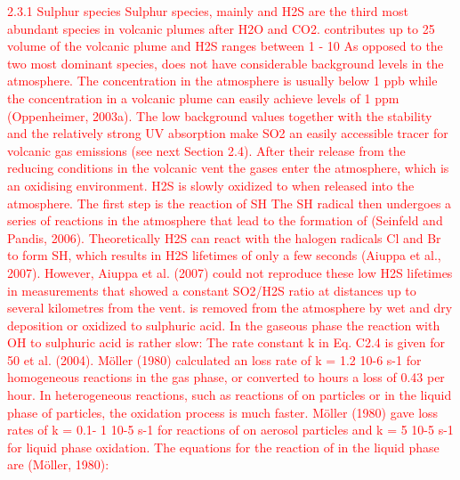 \documentclass  [
  paper    = a4,
  BCOR     = 10mm,
  twoside,
  fontsize = 12pt,
  fleqn,
  toc      = bibnumbered,
  toc      = listofnumbered,
  numbers  = noendperiod,
  headings = normal,
  listof   = leveldown,
  version  = 3.03
]                                       {scrreprt}
\begin{document}
	\textcolor{red}{
	2.3.1 Sulphur species
	Sulphur species, mainly  and H2S are the third most abundant species in
	volcanic plumes after H2O and CO2.  contributes up to 25%
	volume of the volcanic plume and H2S ranges between 1 - 10%
	As opposed to the two most dominant species,  does not have considerable
	background levels in the atmosphere. The  concentration in the atmosphere
	is usually below 1 ppb while the concentration in a volcanic plume can easily
	achieve levels of 1 ppm (Oppenheimer, 2003a). The low background values
	together with the stability and the relatively strong UV absorption make SO2
	an easily accessible tracer for volcanic gas emissions (see next Section 2.4).
	After their release from the reducing conditions in the volcanic vent the gases
	enter the atmosphere, which is an oxidising environment. H2S is slowly oxidized
	to  when released into the atmosphere. The first step is the reaction of SH
	The SH radical then undergoes a series of reactions in the atmosphere that
	lead to the formation of  (Seinfeld and Pandis, 2006). Theoretically H2S
	can react with the halogen radicals Cl and Br to form SH, which results in H2S
	lifetimes of only a few seconds (Aiuppa et al., 2007). However, Aiuppa et al.
	(2007) could not reproduce these low H2S lifetimes in measurements that showed
	a constant SO2/H2S ratio at distances up to several kilometres from the vent.
	 is removed from the atmosphere by wet and dry deposition or oxidized to
	sulphuric acid. In the gaseous phase the reaction with OH to sulphuric acid is
	rather slow:
	The rate constant k in Eq. C2.4 is given for 50%
	et al. (2004). Möller (1980) calculated an  loss rate of k = 1.2 10-6 s-1 for
	homogeneous reactions in the gas phase, or converted to hours a loss of 0.43%
	 per hour. In heterogeneous reactions, such as reactions of  on particles
	or in the liquid phase of particles, the oxidation process is much faster. Möller
	(1980) gave loss rates of k = 0.1- 1 10-5 s-1 for reactions of  on aerosol
	particles and k = 5 10-5 s-1 for liquid phase oxidation. The equations for the reaction of  in the liquid phase are (Möller, 1980):
}
\end{document}
